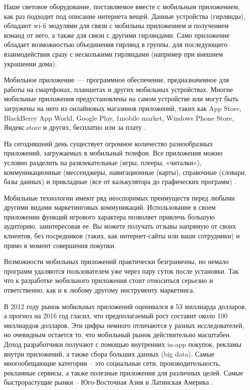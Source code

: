 Наше световое оборудование, поставляемое вместе с мобильным приложением, как раз подходит под описание интернета вещей. Данные устройства (гирлянды), обладают wi-fi модулями для связи с мобильны приложением и получением команд от него, а также для связи с другими гирляндами. Само приложение обладает возможностью объединения гирлянд в группы, для последующего взаимодействия сразу с несколькими гирляндами (например при внешнем украшении дома). 

Мобильное приложение~--- программное обеспечение, предназначенное для работы на смартфонах, планшетах и других мобильных устройствах. Многие мобильные приложения предустановлены на самом устройстве или могут быть загружены на него из онлайновых магазинов приложений, таких как App Store, BlackBerry App World, Google Play, 1mobile market, Windows Phone Store, Яндекс.store и других, бесплатно или за плату \cite{wiki_mobile_def}.

На сегодняшний день существует огромное количество разнообразных приложений, загружаемых в мобильный телефон. Все приложения можно условно разделить на развлекательные (игры, плееры, «читалки»), коммуникационные (мессенджеры, навигационные (карты), справочные (словари, базы данных) и прикладные (все от калькулятора до графических программ) \cite{mobile_business}.

Мобильные технологии имеют ряд неоспоримых преимуществ перед любыми другими видами маркетинговых коммуникаций. Использование в своем приложении функций игрового характера позволяет привлечь большую аудиторию, заинтересовав ее. Вы можете получать отзывы напрямую от своих клиентов, без посредников (таких, как интернет-сайты или ваши сотрудники) и прямо в момент совершения покупки.

Возможности мобильных приложений практически безграничны, но немало программ удаляются пользователем уже через пару суток после установки. Так что к разработке мобильного приложения стоит относиться серьезно и ответственно, как и к любому другому инструменту маркетинга.

В 2012 году рынок мобильных приложений оценивался в 53 миллиарда долларов, а прогноз на 2016 год гласил, что предполагаемый рост составит около 100 миллиардов долларов. Эти цифры немного отличаются у разных исследователей, но очевидным остается то, что мобильный рынок действительно масштабен. Доход разработчики получают с помощью внутренних in-app покупок, рекламы внутри приложений, а также сбора больших данных (big data). Самые многообещающие категории – это социальные сети, производительность, рекламные сервисы, а также полезные приложения для различных целей. Самые быстрорастущие рынки – Юго-Восточная Азия и Латинская Америка \cite{mobile_market}.

